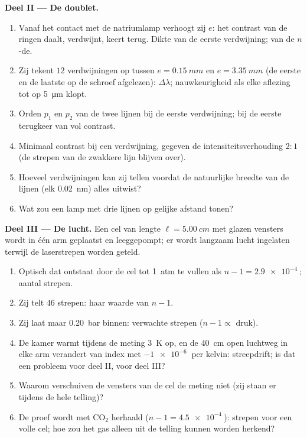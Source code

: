 \begin{problem}
\medskip
\noindent\textbf{Deel II --- De doublet.}
\begin{enumerate}[resume]
  \item Vanaf het contact met de natriumlamp verhoogt zij $e$:
        het contrast van de ringen daalt, verdwijnt, keert terug. Dikte van de
        eerste verdwijning; van de $n$-de.
  \item Zij tekent $12$ verdwijningen op tussen $e = \qty{0.15}{mm}$ en
        $e = \qty{3.35}{mm}$ (de eerste en de laatste op de schroef afgelezen):
        $\Delta\lambda$; nauwkeurigheid als elke aflezing tot op
        \qty{5}{\micro m} klopt.
  \item Orden $p_1$ en $p_2$ van de twee lijnen bij de eerste
        verdwijning; bij de eerste terugkeer van vol contrast.
  \item Minimaal contrast bij een verdwijning, gegeven de
        intensiteitsverhouding $2 : 1$ (de strepen van de zwakkere lijn
        blijven over).
  \item Hoeveel verdwijningen kan zij tellen voordat de natuurlijke
        breedte van de lijnen (elk \qty{0.02}{nm}) alles uitwist?
  \item Wat zou een lamp met drie lijnen op gelijke afstand tonen?
\end{enumerate}

\medskip
\noindent\textbf{Deel III --- De lucht.}
Een cel van lengte $\ell = \qty{5.00}{cm}$ met glazen vensters wordt in één
arm geplaatst en leeggepompt; er wordt langzaam lucht ingelaten terwijl de
laserstrepen
worden geteld.
\begin{enumerate}[resume]
  \item Optisch  dat ontstaat door de cel tot
        \qty{1}{atm} te vullen als $n - 1 = \qty{2.9e-4}{}$; aantal strepen.
  \item Zij telt $46$ strepen: haar waarde van $n - 1$.
  \item Zij laat maar \qty{0.20}{bar} binnen: verwachte strepen ($n - 1 \propto$
        druk).
  \item De kamer warmt tijdens de meting \qty{3}{K} op, en de
        \qty{40}{cm} open luchtweg in elke arm verandert van index met
        $-\qty{1e-6}{}$ per kelvin: streepdrift; is dat een probleem voor
        deel II, voor deel III?
  \item Waarom verschuiven de vensters van de cel de meting niet (zij staan
        er tijdens de hele telling)?
  \item De proef wordt met CO$_2$ herhaald ($n - 1 = \qty{4.5e-4}{}$):
        strepen voor een volle cel; hoe zou het gas alleen uit de telling
        kunnen worden herkend?
\end{enumerate}


\end{problem}
